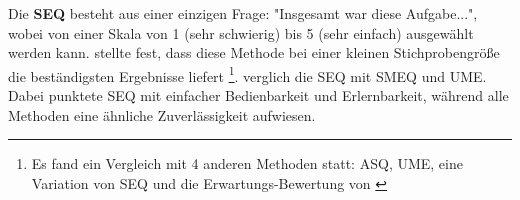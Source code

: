 Die \textbf{\ac{SEQ}} besteht aus einer einzigen Frage: "Insgesamt war diese Aufgabe...",
wobei von einer Skala von 1 (sehr schwierig) bis 5 (sehr einfach) ausgewählt werden kann.
\textcite{tedescoComparisonMethods2006} stellte fest, dass diese Methode bei einer kleinen
Stichprobengröße die beständigsten Ergebnisse liefert \footnote{Es fand ein Vergleich mit 4 anderen
Methoden statt: \ac{ASQ}, \ac{UME}, eine Variation von \ac{SEQ} und die Erwartungs-Bewertung von
\textcite{albertThisWhat2003}}. \textcite{sauroComparisonThree2009} verglich die \ac{SEQ} mit
\ac{SMEQ} und \ac{UME}. Dabei punktete \ac{SEQ} mit einfacher Bedienbarkeit und Erlernbarkeit,
während alle Methoden eine ähnliche Zuverlässigkeit aufwiesen.
